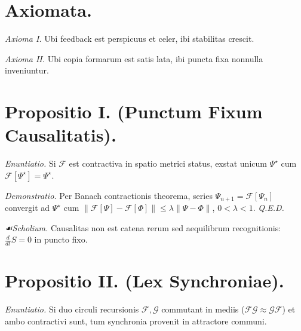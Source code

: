 \documentclass[12pt]{article}
\newcommand{\scholia}{\textit{☙\;}}
\begin{document}
\section*{Axiomata.}

\textit{Axioma I.} \; Ubi feedback est perspicuus et celer, ibi stabilitas crescit.

\textit{Axioma II.} \; Ubi copia formarum est satis lata, ibi puncta fixa nonnulla inveniuntur.

\section*{Propositio I. \; (Punctum Fixum Causalitatis).}

\textit{Enuntiatio.} \; Si \(\mathcal{F}\) est contractiva in spatio metrici status, exstat unicum \(\Psi^\star\) cum \(\mathcal{F}[\Psi^\star]=\Psi^\star\).

\textit{Demonstratio.} Per Banach contractionis theorema, series \(\Psi_{n+1}=\mathcal{F}[\Psi_n]\) convergit ad \(\Psi^\star\) cum \(\|\mathcal{F}[\Psi]-\mathcal{F}[\Phi]\|\le \lambda \|\Psi-\Phi\|\), \(0<\lambda<1\). \textit{Q.E.D.}

\textit{\scholia Scholium.} Causalitas non est catena rerum sed aequilibrum recognitionis: \(\frac{d}{dt}S=0\) in puncto fixo.

\begin{center}
\end{center}

\section*{Propositio II. \; (Lex Synchroniae).}

\textit{Enuntiatio.} \; Si duo circuli recursionis \(\mathcal{F},\mathcal{G}\) commutant in mediis (\(\mathcal{F}\mathcal{G}\approx \mathcal{G}\mathcal{F}\)) et ambo contractivi sunt, tum synchronia provenit in attractore communi.
\end{document}
